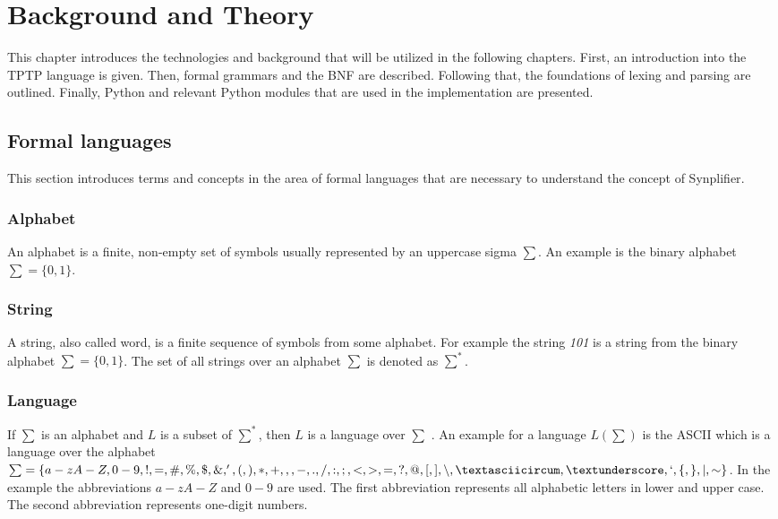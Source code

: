 
\chapter{Background and Theory}\label{cha:Background}

This chapter introduces the technologies and background that will be utilized in the following chapters. First, an introduction into the \ac{TPTP} language is given. Then, formal grammars and the \ac{BNF} are described. Following that, the foundations of lexing and parsing are outlined. Finally, Python and relevant Python modules that are used in the implementation are presented.

\section{Formal languages}\label{sec:BackgroundFormalLanguage}

This section introduces terms and concepts in the area of formal languages that are necessary to understand the concept of \ac{Synplifier}.

\subsection{Alphabet}
An alphabet is a finite, non-empty set of symbols usually represented by an uppercase sigma $\sum$.
An example is the binary alphabet $\sum = \{0,1\}$. \cite{AutomataTheory.2007}

\subsection{String}
A string, also called word, is a finite sequence of symbols from some alphabet. For example the string \textit{101} is a string from the binary alphabet $\sum = \{0,1\}$.
The set of all strings over an alphabet $\sum$ is denoted as $\sum ^{*}$. \cite{AutomataTheory.2007}

\subsection{Language}
If $\sum$ is an alphabet and $L$ is a subset of $\sum ^*$, then $L$ is a language over $\sum$ \cite{AutomataTheory.2007}.
An example for a language $L(\sum)$ is the \ac{ASCII} which is a language over the alphabet $\sum = \{a-zA-Z,0-9,!,=,\#,\%,\$,\&,',(,),*,+,,,-,.,/,:,;,<,>,=,?,@,[,],\backslash ,\textasciicircum ,\textunderscore ,`,\{,\},\mid,\sim\}$. In the example the abbreviations $a-zA-Z$ and $0-9$ are used. The first abbreviation represents all alphabetic letters in lower and upper case. The second abbreviation represents one-digit numbers.

